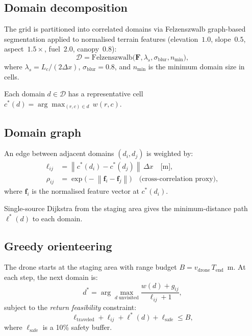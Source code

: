 \documentclass[11pt,twocolumn]{article}
\newcommand{\norm}[1]{\left\lVert#1\right\rVert}
\begin{document}
\subsection{Domain decomposition}

The grid is partitioned into correlated domains via Felzenszwalb
graph-based segmentation applied to normalised terrain features
(elevation~$1.0$, slope~$0.5$, aspect~$1.5\times$, fuel~$2.0$,
canopy~$0.8$):
\begin{equation}
  \mathcal{D} = \mathrm{Felzenszwalb}\!\bigl(\mathbf{F},
    \lambda_s,\sigma_{\mathrm{blur}},n_{\min}\bigr),\label{eq:seg}
\end{equation}
where $\lambda_s=L_c/(2\Delta x)$, $\sigma_{\mathrm{blur}}=0.8$, and
$n_{\min}$ is the minimum domain size in cells.

Each domain $d\in\mathcal{D}$ has a representative cell
$c^*(d)=\arg\max_{(r,c)\in d}\,w(r,c)$.

\subsection{Domain graph}

An edge between adjacent domains $(d_i,d_j)$ is weighted by:
\begin{align}
  \ell_{ij} &= \norm{c^*(d_i)-c^*(d_j)}\,\Delta x\quad\text{[m]},\label{eq:edgelen}\\
  \rho_{ij} &= \exp\!\bigl(-\norm{\mathbf{f}_{i}-\mathbf{f}_{j}}\bigr)
              \quad\text{(cross-correlation proxy)},\label{eq:rho}
\end{align}
where $\mathbf{f}_i$ is the normalised feature vector at $c^*(d_i)$.

Single-source Dijkstra from the staging area gives the minimum-distance
path $\ell^*(d)$ to each domain.

\subsection{Greedy orienteering}

The drone starts at the staging area with range budget
$B=v_{\mathrm{drone}}\,T_{\mathrm{end}}$~m.  At each step, the next
domain is:
\begin{equation}
  d^* = \arg\max_{d\;\mathrm{unvisited}}
    \frac{w(d)+g_{ij}}{\ell_{ij}+1},\label{eq:orient}
\end{equation}
subject to the \textit{return feasibility} constraint:
\begin{equation}
  \ell_{\mathrm{traveled}} + \ell_{ij} + \ell^*(d) + \ell_{\mathrm{safe}} \le B,
  \label{eq:range}
\end{equation}
where $\ell_{\mathrm{safe}}$ is a 10\% safety buffer.
\end{document}
